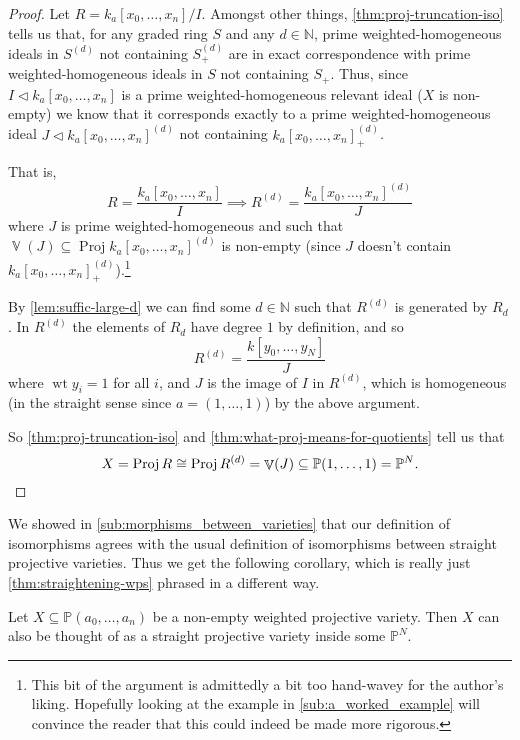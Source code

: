 \documentclass[10pt,notitlepage]{article}
\numberwithin{equation}{subsection}
\DeclareMathOperator{\proj}{Proj}
\DeclareMathOperator{\wt}{wt}
\DeclareMathOperator{\van}{\mathbb{V}}
\newcommand{\pee}{\mathbb{P}}
\newcommand{\nn}{\mathbb{N}}
\newcommand{\kazn}{k_a[x_0,\ldots,x_n]}
\newcommand{\pazn}{\pee(a_0,\ldots,a_n)}
\begin{document}
        \begin{proof}
            Let $R=\kazn/I$.
            Amongst other things, \cref{thm:proj-truncation-iso} tells us that, for any graded ring $S$ and any $d\in\nn$, prime weighted-homogeneous ideals in $S^{(d)}$ not containing $S^{(d)}_+$ are in exact correspondence with prime weighted-homogeneous ideals in $S$ not containing $S_+$.
            Thus, since \mbox{$I\triangleleft\kazn$} is a prime weighted-homogeneous relevant ideal ($X$ is non-empty) we know that it corresponds exactly to a prime weighted-homogeneous ideal $J\triangleleft\kazn^{(d)}$ not containing $\kazn^{(d)}_+$.

            That is,
            \[
                R = \frac{\kazn}{I} \implies R^{(d)} = \frac{\kazn^{(d)}}{J}
            \]
            where $J$ is prime weighted-homogeneous and such that $\van(J)\subseteq\proj\kazn^{(d)}$ is non-empty (since $J$ doesn't contain $\kazn^{(d)}_+$).\footnote{%
                This bit of the argument is admittedly a bit too hand-wavey for the author's liking.
                Hopefully looking at the example in \cref{sub:a_worked_example} will convince the reader that this could indeed be made more rigorous.
            }

            By \cref{lem:suffic-large-d} we can find some $d\in\nn$ such that $R^{(d)}$ is generated by $R_d$.
            In $R^{(d)}$ the elements of $R_d$ have degree $1$ by definition, and so
            \[
                R^{(d)} = \frac{k[y_0,\ldots,y_N]}{J}
            \]
            where $\wt y_i=1$ for all $i$, and $J$ is the image of $I$ in $R^{(d)}$, which is homogeneous (in the straight sense since $a=(1,\ldots,1)$) by the above argument.

            So \cref{thm:proj-truncation-iso} and \cref{thm:what-proj-means-for-quotients} tell us that
            \[
                X = \proj R \cong \proj R^{(d)} = \van(J)\subseteq\pee(1,\ldots,1) = \pee^N.\qedhere
            \]
        \end{proof}

        We showed in \cref{sub:morphisms_between_varieties} that our definition of isomorphisms agrees with the usual definition of isomorphisms between straight projective varieties.
        Thus we get the following corollary, which is really just \cref{thm:straightening-wps} phrased in a different way.

        \begin{corollary}\label{cor:wpv-can-be-though-of-as-spv-for-some-N}
            Let $X\subseteq\pazn$ be a non-empty weighted projective variety.
            Then $X$ can also be thought of as a straight projective variety inside some $\pee^N$.
        \end{corollary}
\end{document}
